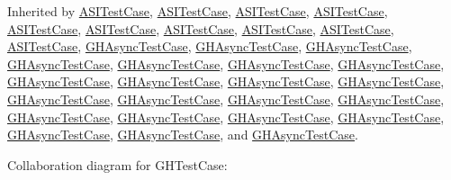 \-Inherited by \hyperlink{interface_a_s_i_test_case}{\-A\-S\-I\-Test\-Case}, \hyperlink{interface_a_s_i_test_case}{\-A\-S\-I\-Test\-Case}, \hyperlink{interface_a_s_i_test_case}{\-A\-S\-I\-Test\-Case}, \hyperlink{interface_a_s_i_test_case}{\-A\-S\-I\-Test\-Case}, \hyperlink{interface_a_s_i_test_case}{\-A\-S\-I\-Test\-Case}, \hyperlink{interface_a_s_i_test_case}{\-A\-S\-I\-Test\-Case}, \hyperlink{interface_a_s_i_test_case}{\-A\-S\-I\-Test\-Case}, \hyperlink{interface_a_s_i_test_case}{\-A\-S\-I\-Test\-Case}, \hyperlink{interface_a_s_i_test_case}{\-A\-S\-I\-Test\-Case}, \hyperlink{interface_a_s_i_test_case}{\-A\-S\-I\-Test\-Case}, \hyperlink{interface_g_h_async_test_case}{\-G\-H\-Async\-Test\-Case}, \hyperlink{interface_g_h_async_test_case}{\-G\-H\-Async\-Test\-Case}, \hyperlink{interface_g_h_async_test_case}{\-G\-H\-Async\-Test\-Case}, \hyperlink{interface_g_h_async_test_case}{\-G\-H\-Async\-Test\-Case}, \hyperlink{interface_g_h_async_test_case}{\-G\-H\-Async\-Test\-Case}, \hyperlink{interface_g_h_async_test_case}{\-G\-H\-Async\-Test\-Case}, \hyperlink{interface_g_h_async_test_case}{\-G\-H\-Async\-Test\-Case}, \hyperlink{interface_g_h_async_test_case}{\-G\-H\-Async\-Test\-Case}, \hyperlink{interface_g_h_async_test_case}{\-G\-H\-Async\-Test\-Case}, \hyperlink{interface_g_h_async_test_case}{\-G\-H\-Async\-Test\-Case}, \hyperlink{interface_g_h_async_test_case}{\-G\-H\-Async\-Test\-Case}, \hyperlink{interface_g_h_async_test_case}{\-G\-H\-Async\-Test\-Case}, \hyperlink{interface_g_h_async_test_case}{\-G\-H\-Async\-Test\-Case}, \hyperlink{interface_g_h_async_test_case}{\-G\-H\-Async\-Test\-Case}, \hyperlink{interface_g_h_async_test_case}{\-G\-H\-Async\-Test\-Case}, \hyperlink{interface_g_h_async_test_case}{\-G\-H\-Async\-Test\-Case}, \hyperlink{interface_g_h_async_test_case}{\-G\-H\-Async\-Test\-Case}, \hyperlink{interface_g_h_async_test_case}{\-G\-H\-Async\-Test\-Case}, \hyperlink{interface_g_h_async_test_case}{\-G\-H\-Async\-Test\-Case}, \hyperlink{interface_g_h_async_test_case}{\-G\-H\-Async\-Test\-Case}, \hyperlink{interface_g_h_async_test_case}{\-G\-H\-Async\-Test\-Case}, and \hyperlink{interface_g_h_async_test_case}{\-G\-H\-Async\-Test\-Case}.



\-Collaboration diagram for \-G\-H\-Test\-Case\-:
